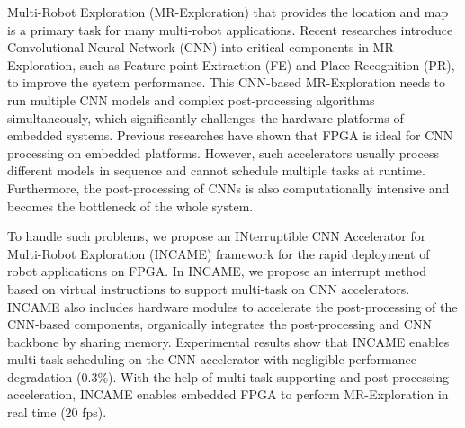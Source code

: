 Multi-Robot Exploration (MR-Exploration) that provides the location and map is a primary task for many multi-robot applications. Recent researches introduce Convolutional Neural Network (CNN) into critical components in MR-Exploration, such as Feature-point Extraction (FE) and Place Recognition (PR), to improve the system performance. This CNN-based MR-Exploration needs to run multiple CNN models and complex post-processing algorithms simultaneously, which significantly challenges the hardware platforms of embedded systems.
Previous researches have shown that FPGA is ideal for CNN processing on embedded platforms. However, such accelerators usually process different models in sequence and cannot schedule multiple tasks at runtime. Furthermore, the post-processing of CNNs is also computationally intensive and becomes the bottleneck of the whole system.

To handle such problems, we propose an INterruptible CNN Accelerator for Multi-Robot Exploration (INCAME) framework for the rapid deployment of robot applications on FPGA. In INCAME, we propose an interrupt method based on virtual instructions to support multi-task on CNN accelerators. INCAME also includes hardware modules to accelerate the post-processing of the CNN-based components, organically integrates the post-processing and CNN backbone by sharing memory.
Experimental results show that INCAME enables multi-task scheduling on the CNN accelerator with negligible performance degradation (0.3\%). With the help of multi-task supporting and post-processing acceleration, INCAME enables embedded FPGA to perform MR-Exploration in real time (20 fps).

